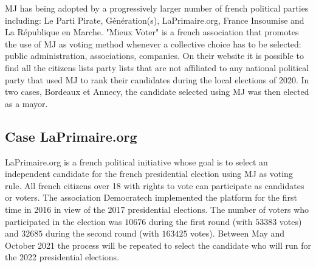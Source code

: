%

\ac{MJ} has being adopted by a progressively larger number of french political parties including: Le Parti Pirate, Génération(s), LaPrimaire.org, France Insoumise and La République en Marche.
"Mieux Voter" \citep{MV} is a french association that promotes the use of \ac{MJ} as voting method whenever a collective choice has to be selected: public administration, associations, companies. On their website it is possible to find all the citizens lists \textendash party lists that are not affiliated to any national political party \textemdash that used \ac{MJ} to rank their candidates during the local elections of 2020. In two cases, Bordeaux et Annecy, the candidate selected using \ac{MJ} was then elected as a mayor. 


\subsection*{Case LaPrimaire.org}
LaPrimaire.org \citep{LaPrimaire} is a french political initiative whose goal is to select an independent candidate for the french presidential election using \ac{MJ} as voting rule. All french citizens over 18 with rights to vote can participate as candidates or voters. The association Democratech implemented the platform for the first time in 2016 in view of the 2017 presidential elections. The number of voters who participated in the election was $10676$ during the first round (with $53383$ votes) and $32685$ during the second round (with $163425$ votes). Between May and October 2021 the process will be repeated to select the candidate who will run for the 2022 presidential elections.

